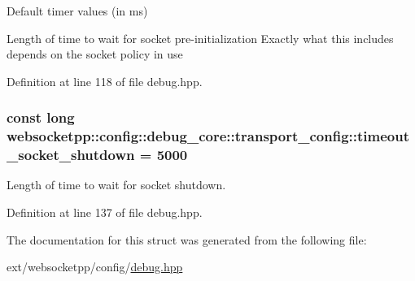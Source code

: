 Default timer values (in ms) 

Length of time to wait for socket pre-\/initialization Exactly what this includes depends on the socket policy in use 

Definition at line 118 of file debug.\+hpp.

\hypertarget{structwebsocketpp_1_1config_1_1debug__core_1_1transport__config_a8d8f7daa43c1fd23d227f3f20e71ceb5}{}
\subsubsection[{timeout\+\_\+socket\+\_\+shutdown}]{\setlength{\rightskip}{0pt plus 5cm}const long websocketpp\+::config\+::debug\+\_\+core\+::transport\+\_\+config\+::timeout\+\_\+socket\+\_\+shutdown = 5000\hspace{0.3cm}{\ttfamily [static]}}\label{structwebsocketpp_1_1config_1_1debug__core_1_1transport__config_a8d8f7daa43c1fd23d227f3f20e71ceb5}


Length of time to wait for socket shutdown. 



Definition at line 137 of file debug.\+hpp.



The documentation for this struct was generated from the following file\+:\begin{DoxyCompactItemize}
\item 
ext/websocketpp/config/\hyperlink{debug_8hpp}{debug.\+hpp}\end{DoxyCompactItemize}
